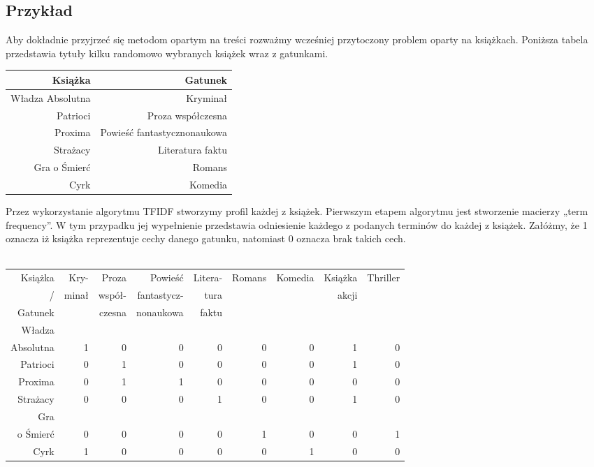 \documentclass[12pt,a4paper]{report}
\begin{document}
\subsection{Przykład}
Aby dokładnie przyjrzeć się metodom opartym na treści rozważmy wcześniej przytoczony problem oparty na książkach.
Poniższa tabela przedstawia tytuły kilku randomowo wybranych książek wraz z gatunkami.
\begin{center}
\begin{tabular}{|r|r|} \hline
\textbf{Książka} & \textbf{Gatunek} \\
\hline 
Władza Absolutna & Kryminał  \\
\hline 
Patrioci & Proza współczesna \\
\hline 
Proxima & Powieść fantastycznonaukowa \\
\hline 
Strażacy & Literatura faktu \\
\hline 
Gra o Śmierć & Romans \\
\hline 
Cyrk & Komedia \\
\hline
\end{tabular}
\end{center}
Przez wykorzystanie algorytmu TFIDF stworzymy profil każdej z książek.
Pierwszym etapem algorytmu jest stworzenie macierzy „term frequency”. W tym przypadku jej wypełnienie przedstawia odniesienie każdego z podanych terminów do każdej z książek. Załóżmy, że 1 oznacza iż książka reprezentuje cechy danego gatunku, natomiast 0 oznacza brak takich cech. 
\\
\\
\footnotesize{
\begin{tabular}{|r|r|r|r|r|r|r|r|r|} \hline
Książka  & Kry- & Proza &  Powieść & Litera- & Romans & Komedia & Książka & Thriller\\
/ & minał & współ- &  fantastycz- & tura &  &  & akcji & \\
Gatunek & & czesna &  nonaukowa & faktu &  &  &  & \\
\hline \hline 
Władza & &  &  &  &  & &  &  \\
Absolutna & 1 & 0 & 0 & 0 & 0 & 0 & 1 & 0 \\
Patrioci & 0 & 1 & 0 & 0 & 0 & 0 & 1 & 0 \\
Proxima & 0 & 1 & 1 & 0 & 0 & 0 & 0 & 0 \\
Strażacy & 0 & 0 & 0 & 1 & 0 & 0 & 1 & 0 \\
Gra & &  &  &  &  & &  &  \\
o Śmierć & 0 & 0 & 0 & 0 & 1 & 0 & 0 & 1 \\
Cyrk & 1 & 0 & 0 & 0 & 0 & 1 & 0 & 0\\
\hline
\end{tabular}
}
\end{document}

